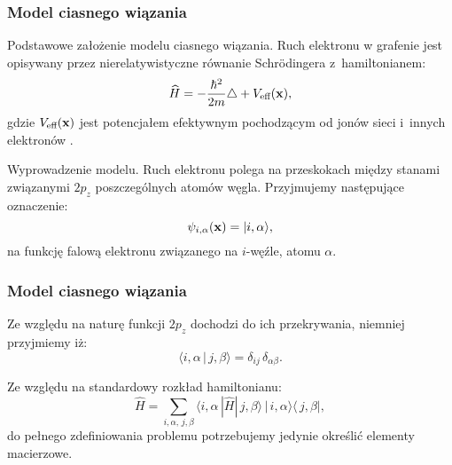 \documentclass[10pt,t]{beamer}
\begin{document}
\begin{frame}
  \frametitle{Model ciasnego wiązania}


  Podstawowe założenie modelu ciasnego wiązania. Ruch elektronu w grafenie
  jest opisywany przez nierelatywistyczne równanie Schr\"{o}dingera
  z~hamiltonianem:
  \begin{equation}
    \label{eq:Grafen-czyli-01}
    \widehat{ H } =
    -\frac{ \hbar^{ 2 } }{ 2 m } \triangle + V_{ \textrm{eff} }( \mathbf{x} ),
  \end{equation}
  gdzie $V_{ \textrm{eff} }( \mathbf{x} )$ jest potencjałem efektywnym
  pochodzącym od jonów sieci i~innych elektronów \cite{EWQTN}.

  Wyprowadzenie modelu. Ruch elektronu polega na przeskokach między stanami
  związanymi $2 p_{ z }$ poszczególnych atomów węgla. Przyjmujemy następujące
  oznaczenie:
  \begin{equation}
    \label{eq:Grafen-czyli-02}
    \psi_{ i, \alpha }( \mathbf{x} ) = | i, \alpha \rangle,
  \end{equation}
  na funkcję falową elektronu związanego na $i$-węźle, atomu $\alpha$.

\end{frame}





\begin{frame}
  \frametitle{Model ciasnego wiązania}


  Ze względu na naturę funkcji $2 p_{ z }$ dochodzi do ich przekrywania,
  niemniej przyjmiemy iż:
  \begin{equation}
    \label{eq:Grafen-czyli-03}
    \langle i, \alpha \, | \, j, \beta \rangle = \delta_{ i j } \, \delta_{ \alpha \beta }.
  \end{equation}

  Ze względu na standardowy rozkład hamiltonianu:
  \begin{equation}
    \label{eq:Grafen-czyli-04}
    \widehat{ H } =
    \sum_{ i, \alpha, \, j, \beta } \langle i, \alpha \, | \widehat{ H } | \, j, \beta \rangle \,
    | \, i, \alpha \rangle \langle \, j,\beta |,
  \end{equation}
  do pełnego zdefiniowania problemu potrzebujemy jedynie określić elementy
  macierzowe.

\end{frame}
\end{document}
